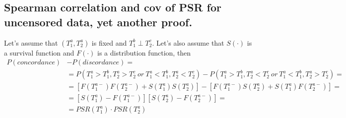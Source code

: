 \documentclass[]{article}
\begin{document}

\subsection{Spearman correlation and cov of PSR for uncensored data, yet another proof.}
Let's assume that $(T^a_1, T^a_2)$ is fixed and $T^b_1 \perp T^c_2$. Let's also assume that $S(\cdot)$ is a survival function and $F(\cdot)$ is a distribution function, then
	$$
	\begin{aligned}
		P(concordance) &- P(discordance) = \\
      &=P(T^a_1>T^b_1, T^a_2 > T^c_2 ~or ~T^a_1<T^b_1, T^a_2 < T^c_2) - P(T^a_1>T^b_1, T^a_2 < T^c_2 ~or ~T^a_1<T^b_1, T^a_2 > T^c_2)=\\
      &=[F(T^{a-}_1)F(T^{a-}_2) + S(T^a_1) S(T^a_2)] - [ F(T^{a-}_1) S(T^a_2) + S(T^a_1)F(T^{a-}_2)]=\\
      &=[S(T^a_1) - F(T^{a-}_1)][S(T^{a}_2) -F(T^{a-}_2)]=\\
      &=PSR(T^a_1)\cdot PSR(T^a_2)\\
	\end{aligned}
	$$
\end{document}
